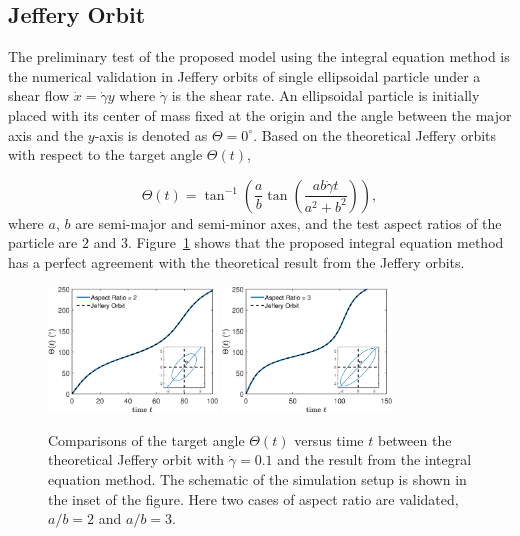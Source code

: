 \documentclass[lineno]{jfm}
\begin{document}
\subsection{Jeffery Orbit}


The preliminary test of the proposed model using the integral equation method is the numerical validation in Jeffery orbits of single ellipsoidal particle under a shear flow $\dot x = \dot\gamma y$ where $\dot\gamma$ is the shear rate. An ellipsoidal particle is initially placed with its center of mass fixed at the origin and the angle between the major axis and the $y$-axis is denoted as $\Theta = 0^\circ$. Based on the theoretical Jeffery orbits with respect to the target angle $\Theta(t)$, 

\begin{equation}
\Theta(t) = \tan^{-1}\left(\frac{a}{b}\tan \left(\frac{ab \dot\gamma t}{a^2+b^2}\right)\right),
\end{equation}
%
where $a$, $b$ are semi-major and semi-minor axes, and the test aspect ratios of the particle are $2$ and $3$. Figure~\ref{figure1} shows that the proposed integral equation method has a perfect agreement with the theoretical result from the Jeffery orbits.


\begin{figure}
\centering
\includegraphics[width=0.4\textwidth]{JefferyOrbit2.eps}
\includegraphics[width=0.4\textwidth]{JefferyOrbit3.eps}
  \caption{Comparisons of the target angle $\Theta(t)$ versus time $t$ between the theoretical Jeffery orbit with $\dot\gamma=0.1$ and the result from the integral equation method. The schematic of the simulation setup is shown in the inset of the figure. Here two cases of aspect ratio are validated, $a/b = 2$ and $a/b=3$.
  }
    \label{figure1}
\end{figure}
\end{document}
